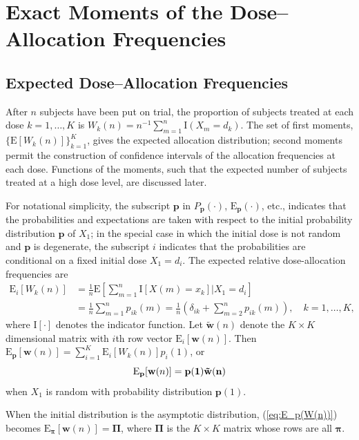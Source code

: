 \section{Exact Moments of the Dose--Allocation Frequencies}

\subsection{Expected Dose--Allocation Frequencies}\label{sec:trialfrequencies}
After $n$ subjects have been put on trial, the proportion of subjects treated at each dose $k=1,\ldots,K$ is $W_k(n)=n^{-1}\sum_{m=1}^n\textrm{I}(X_m=d_k)$.
%
The set of first moments, $\{\mathrm{E}[W_k(n)]\}_{k=1}^K$, gives the expected allocation distribution; second moments permit the construction of confidence intervals of the allocation frequencies at each dose.  Functions of the moments, such that the expected number of subjects treated at a high dose level, are discussed later.

For notational simplicity, the subscript $\mathbf{p}$ in $P_{\mathbf{p}}(\cdot)$,
$\mathrm{E}_{\mathbf{p}}(\cdot)$, etc., indicates that the probabilities and
expectations are taken with respect to the initial probability distribution $\mathbf{p}$ of
$X_1$; in the special case in which the initial dose is not
random and $\mathbf{p}$ is degenerate, the subscript $i$ indicates
that the probabilities are conditional on a fixed initial dose
$X_1=d_i$.  The expected relative dose-allocation frequencies are
\begin{align}\label{eq:E_i(W_k(n))}
\mathrm{E}_i\left[W_k(n)\right]
&=\frac{1}{n}\mathrm{E}\left[\sum_{m=1}^n\textrm{I}[X(m)=x_k]|X_1=d_i\right]\nonumber \\
&=\frac{1}{n}\sum_{m=1}^np_{ik}(m)=\frac{1}{n}\left(\delta_{ik}+
\sum_{m=2}^np_{ik}(m)\right),\quad k=1,\ldots, K,
\end{align}
where $\textrm{I}[\cdot]$ denotes the indicator function. Let $\tilde{\mathbf{w}}(n)$ denote the $K\times K$ dimensional matrix
with $i$th row vector $\mathrm{E}_i[\mathbf{w}(n)]$.  Then
$\mathrm{E}_{\mathbf{p}}[\mathbf{w}(n)]
=\sum_{i=1}^K\mathrm{E}_i[W_k(n)]p_i(1)$, or
%
\begin{equation}\label{eq:E_p(W(n))}
\mathrm{E}_{\mathbf{p}}[\mathbf{w}(n)]
=\bf{p}(1)\tilde{\mathbf{w}}(n)
\end{equation}
when $X_1$ is random with probability distribution $\mathbf{p}(1)$.

When the initial distribution is the asymptotic distribution,
(\ref{eq:E_p(W(n))}) becomes $\mathrm{E}_{\boldsymbol{\pi}}[\mathbf{w}(n)]=\boldsymbol{\Pi}$, where
$\mathbf{\Pi}$ is the $K\times K$ matrix whose rows are all $\boldsymbol{\pi}$.

